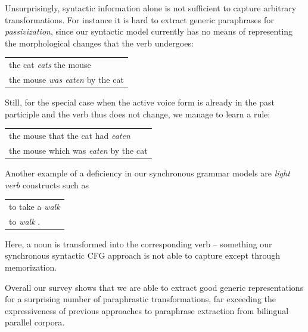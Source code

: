 \documentclass[11pt]{article}
\begin{document}
Unsurprisingly, syntactic information alone is not sufficient to
capture arbitrary transformations. For instance it is hard to extract
generic paraphrases for \emph{passivization}, since our syntactic
model currently has no means of representing the morphological changes that the
verb undergoes:
\begin{center}
\begin{tabular}{l}
  the cat \emph{eats} the mouse \\
  the mouse \emph{was eaten} by the cat \\
\end{tabular}

\end{center}
Still, for the special case when the active voice form is already in
the past participle and the verb thus does not change, we manage to
learn a rule:
\begin{center}
\begin{tabular}{l}
  the mouse that the cat had \emph{eaten} \\
  the mouse which was \emph{eaten} by the cat \\
\end{tabular}
\end{center}
%
Another example of a deficiency in our synchronous grammar models are
\emph{light verb} constructs such as
\begin{center}
\begin{tabular}{l}
  to take a \emph{walk} \\
  to \emph{walk} .
\end{tabular}
\end{center}
Here, a noun is transformed into the corresponding verb -- something
our synchronous syntactic CFG approach is not able to capture except
through memorization.

Overall our survey shows that we are able to extract good generic
representations for a surprising number of paraphrastic
transformations, far exceeding the expressiveness of previous
approaches to paraphrase extraction from bilingual parallel corpora.



\end{document}
